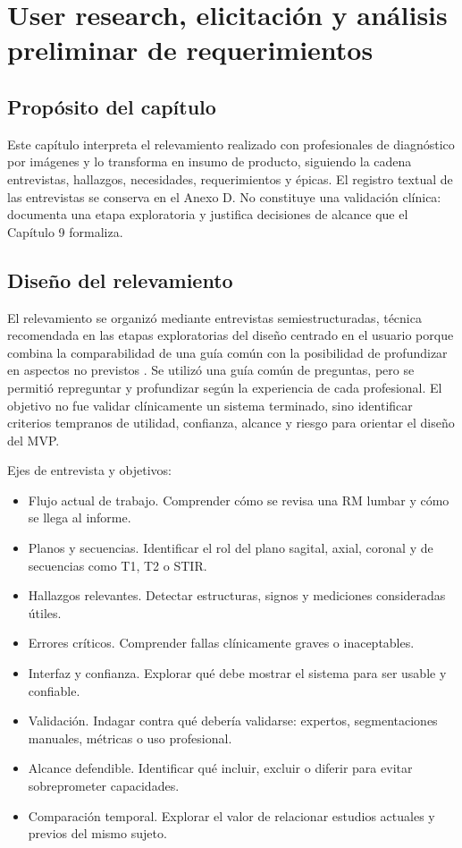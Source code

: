 \chapter{User research, elicitación y análisis preliminar de requerimientos}

\section{Propósito del capítulo}

Este capítulo interpreta el relevamiento realizado con profesionales de diagnóstico por imágenes y lo transforma en insumo de producto, siguiendo la cadena entrevistas, hallazgos, necesidades, requerimientos y épicas. El registro textual de las entrevistas se conserva en el Anexo D. No constituye una validación clínica: documenta una etapa exploratoria y justifica decisiones de alcance que el Capítulo 9 formaliza.

\section{Diseño del relevamiento}

El relevamiento se organizó mediante entrevistas semiestructuradas, técnica recomendada en las etapas exploratorias del diseño centrado en el usuario porque combina la comparabilidad de una guía común con la posibilidad de profundizar en aspectos no previstos \parencite{goodman_observing_user_experience_2012}. Se utilizó una guía común de preguntas, pero se permitió repreguntar y profundizar según la experiencia de cada profesional. El objetivo no fue validar clínicamente un sistema terminado, sino identificar criterios tempranos de utilidad, confianza, alcance y riesgo para orientar el diseño del MVP.

Ejes de entrevista y objetivos:

\begin{itemize}
  \item Flujo actual de trabajo. Comprender cómo se revisa una RM lumbar y cómo se llega al informe.
  \item Planos y secuencias. Identificar el rol del plano sagital, axial, coronal y de secuencias como T1, T2 o STIR.
  \item Hallazgos relevantes. Detectar estructuras, signos y mediciones consideradas útiles.
  \item Errores críticos. Comprender fallas clínicamente graves o inaceptables.
  \item Interfaz y confianza. Explorar qué debe mostrar el sistema para ser usable y confiable.
  \item Validación. Indagar contra qué debería validarse: expertos, segmentaciones manuales, métricas o uso profesional.
  \item Alcance defendible. Identificar qué incluir, excluir o diferir para evitar sobreprometer capacidades.
  \item Comparación temporal. Explorar el valor de relacionar estudios actuales y previos del mismo sujeto.
\end{itemize}

